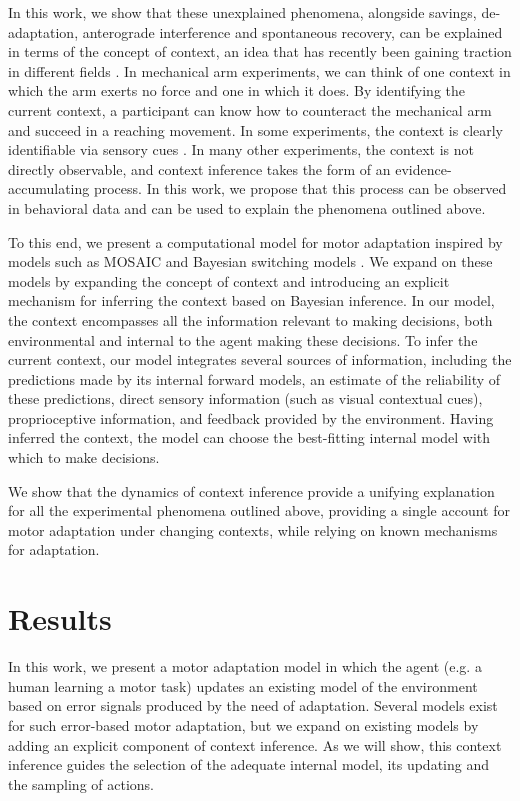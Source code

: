 \documentclass[a4paper,doc,floatsintext,natbib]{apa6}
\begin{document}
In this work, we show that these unexplained phenomena, alongside savings, de-adaptation, anterograde interference and spontaneous recovery, can be explained in terms of the concept of context, an idea that has recently been gaining traction in different fields \cite[e.g.][]{Sanders_Hippocampal_2020,Hunter_Contextsensitive_2021}. In mechanical arm experiments, we can think of one context in which the arm exerts no force and one in which it does. By identifying the current context, a participant can know how to counteract the mechanical arm and succeed in a reaching movement. In some experiments, the context is clearly identifiable via sensory cues \cite[e.g.][]{Gandolfo_Motor_1996,Shadmehr_Adaptive_1994,Ethier_Spontaneous_2008}. In many other experiments, the context is not directly observable, and context inference takes the form of an evidence-accumulating process. In this work, we propose that this process can be observed in behavioral data and can be used to explain the phenomena outlined above.

To this end, we present a computational model for motor adaptation inspired by models such as MOSAIC \citep{Wolpert_Multiple_1998} and Bayesian switching models \citep{Kording_Bayesian_2004,Oh_Minimizing_2019}. We expand on these models by expanding the concept of context and introducing an explicit mechanism for inferring the context based on Bayesian inference. In our model, the context encompasses all the information relevant to making decisions, both environmental and internal to the agent making these decisions. To infer the current context, our model integrates several sources of information, including the predictions made by its internal forward models, an estimate of the reliability of these predictions, direct sensory information (such as visual contextual cues), proprioceptive information, and feedback provided by the environment. Having inferred the context, the model can choose the best-fitting internal model with which to make decisions.

We show that the dynamics of context inference provide a unifying explanation for all the experimental phenomena outlined above, providing a single account for motor adaptation under changing contexts, while relying on known mechanisms for adaptation.

\section{Results}
In this work, we present a motor adaptation model in which the agent (e.g. a human learning a motor task) updates an existing model of the environment based on error signals produced by the need of adaptation. Several models exist for such error-based motor adaptation, but we expand on existing models by adding an explicit component of context inference. As we will show, this context inference guides the selection of the adequate internal model, its updating and the sampling of actions.
\end{document}
